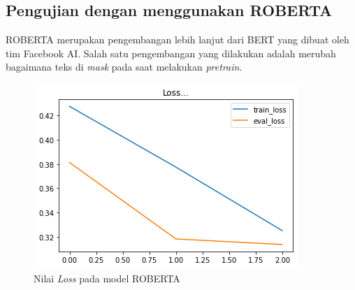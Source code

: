\subsection{Pengujian dengan menggunakan ROBERTA}

ROBERTA merupakan pengembangan lebih lanjut dari BERT yang dibuat oleh tim Facebook AI. Salah satu pengembangan yang dilakukan adalah merubah bagaimana teks di \textit{mask} pada saat melakukan \textit{pretrain}.

\begin{figure}[h]
    \begin{center}
        \includegraphics[width= 0.9\linewidth]{gambar/loss_roberta522.png}
        \caption{Nilai \textit{Loss} pada model ROBERTA}
        \label{fig: loss_roberta}
    \end{center}
\end{figure}

